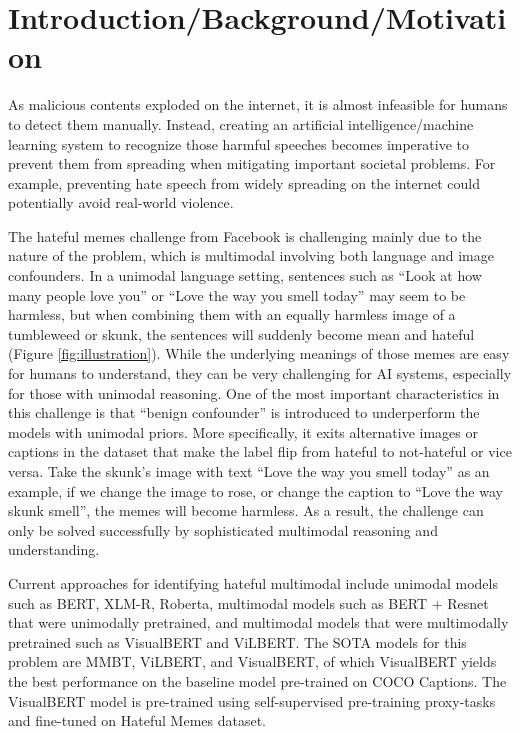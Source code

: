 \documentclass[10pt,twocolumn,letterpaper]{article}
\begin{document}
\section{Introduction/Background/Motivation}

As malicious contents exploded on the internet, it is almost infeasible for humans to detect them manually. Instead, creating an artificial intelligence/machine learning system to recognize those harmful speeches becomes imperative to prevent them from spreading when mitigating important societal problems. For example, preventing hate speech from widely spreading on the internet could potentially avoid real-world violence.
 
The hateful memes challenge from Facebook is challenging mainly due to the nature of the problem, which is multimodal involving both language and image confounders. In a unimodal language setting, sentences such as “Look at how many people love you” or “Love the way you smell today” may seem to be harmless, but when combining them with an equally harmless image of a tumbleweed or skunk, the sentences will suddenly become mean and hateful (Figure \ref{fig:illustration}). While the underlying meanings of those memes are easy for humans to understand, they can be very challenging for AI systems, especially for those with unimodal reasoning. One of the most important characteristics in this challenge is that “benign confounder” is introduced to underperform the models with unimodal priors. More specifically, it exits alternative images or captions in the dataset that make the label flip from hateful to not-hateful or vice versa. Take the skunk’s image with text “Love the way you smell today” as an example, if we change the image to rose, or change the caption to “Love the way skunk smell”, the memes will become harmless. As a result, the challenge can only be solved successfully by sophisticated multimodal reasoning and understanding. 

Current approaches for identifying hateful multimodal include unimodal models such as BERT, XLM-R, Roberta, multimodal models such as BERT + Resnet that were unimodally pretrained, and multimodal models that were multimodally pretrained such as VisualBERT and ViLBERT. The SOTA models for this problem are MMBT, ViLBERT, and VisualBERT, of which VisualBERT yields the best performance on the baseline model pre-trained on COCO Captions. The VisualBERT model is pre-trained using self-supervised pre-training proxy-tasks and fine-tuned on Hateful Memes dataset. 
\end{document}
